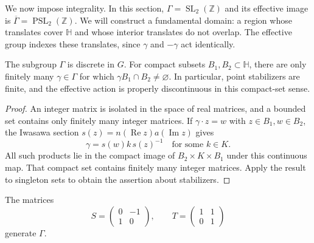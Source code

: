 We now impose integrality. In this section, $\Gamma=\operatorname{SL}_2(\mathbb Z)$ and its effective image is $\overline\Gamma=\operatorname{PSL}_2(\mathbb Z)$. We will construct a fundamental domain: a region whose translates cover $\mathbb H$ and whose interior translates do not overlap. The effective group indexes these translates, since $\gamma$ and $-\gamma$ act identically.

\begin{proposition}\label{modular.properness}
The subgroup $\Gamma$ is discrete in $G$. For compact subsets $B_1,B_2\subset\mathbb H$, there are only finitely many $\gamma\in\Gamma$ for which $\gamma B_1\cap B_2\ne\varnothing$. In particular, point stabilizers are finite, and the effective action is properly discontinuous in this compact-set sense.
\end{proposition}

\begin{proof}
An integer matrix is isolated in the space of real matrices, and a bounded set contains only finitely many integer matrices. If $\gamma\cdot z=w$ with $z\in B_1,w\in B_2$, the Iwasawa section $s(z)=n(\operatorname{Re}z)a(\operatorname{Im}z)$ gives
\[
 \gamma=s(w)k\,s(z)^{-1}\quad\text{for some }k\in K.
\]
All such products lie in the compact image of $B_2\times K\times B_1$ under this continuous map. That compact set contains finitely many integer matrices. Apply the result to singleton sets to obtain the assertion about stabilizers.
\end{proof}

\begin{proposition}[Generators]\label{modular.generators}
The matrices
\[
 S=\begin{pmatrix}0&-1\\1&0\end{pmatrix},\qquad
 T=\begin{pmatrix}1&1\\0&1\end{pmatrix}
\]
generate $\Gamma$.
\end{proposition}

